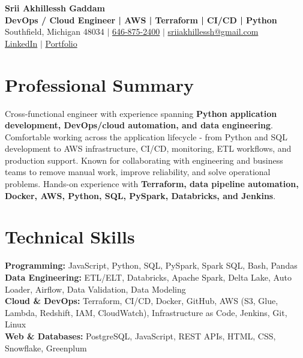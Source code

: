 \documentclass[letterpaper,10pt]{article}
\begin{document}
\fontsize{9.35pt}{10.45pt}\selectfont

\begin{center}
    {\LARGE \textbf{Srii Akhillessh Gaddam}} \\[-1pt]
    \textbf{DevOps / Cloud Engineer | AWS | Terraform | CI/CD | Python} \\[2pt]
    Southfield, Michigan 48034 $|$
    \href{tel:6468752400}{646-875-2400} $|$
    \href{mailto:sriiakhillessh@gmail.com}{sriiakhillessh@gmail.com} \\[1pt]
    \href{https://www.linkedin.com/in/srii-akhiilessh-gaddam-b48668191/}{LinkedIn} $|$
    \href{https://sriiakhillesshg.github.io/portfolio/}{Portfolio}
\end{center}
\vspace{-8pt}

\section{Professional Summary}
\small{Cross-functional engineer with experience spanning \textbf{Python application development, DevOps/cloud automation, and data engineering}. Comfortable working across the application lifecycle - from Python and SQL development to AWS infrastructure, CI/CD, monitoring, ETL workflows, and production support. Known for collaborating with engineering and business teams to remove manual work, improve reliability, and solve operational problems. Hands-on experience with \textbf{Terraform, data pipeline automation, Docker, AWS, Python, SQL, PySpark, Databricks, and Jenkins}.}

\section{Technical Skills}
\small{
\textbf{Programming:} JavaScript, Python, SQL, PySpark, Spark SQL, Bash, Pandas \\
\textbf{Data Engineering:} ETL/ELT, Databricks, Apache Spark, Delta Lake, Auto Loader, Airflow, Data Validation, Data Modeling \\
\textbf{Cloud \& DevOps:} Terraform, CI/CD, Docker, GitHub, AWS (S3, Glue, Lambda, Redshift, IAM, CloudWatch), Infrastructure as Code, Jenkins, Git, Linux \\
\textbf{Web \& Databases:} PostgreSQL, JavaScript, REST APIs, HTML, CSS, Snowflake, Greenplum
}
\end{document}
